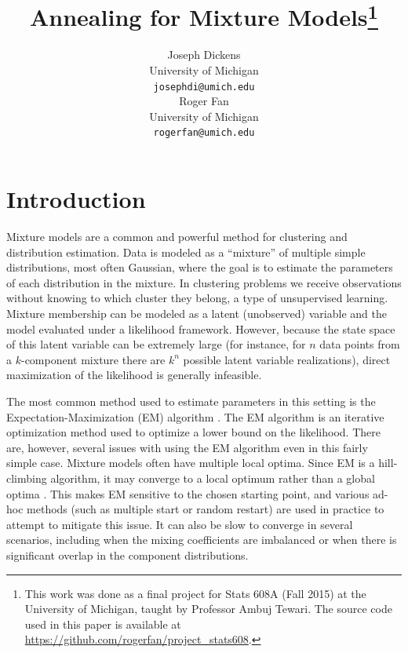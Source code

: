 \documentclass{article}
\theoremstyle{definition}
\theoremstyle{algodesc}
\begin{document}
\title{Annealing for Mixture Models\thanks{This work was done as a final project for Stats 608A (Fall 2015) at the University of Michigan, taught by Professor Ambuj Tewari. The source code used in this paper is available at \url{https://github.com/rogerfan/project_stats608}.}}
\author{
  Joseph Dickens \\
  University of Michigan \\
  \texttt{josephdi@umich.edu} \\
\And
  Roger Fan \\
  University of Michigan\\
  \texttt{rogerfan@umich.edu} \\
}

\maketitle


\section{Introduction} \label{sec:intro}

Mixture models are a common and powerful method for clustering and distribution estimation. Data is modeled as a ``mixture'' of multiple simple distributions, most often Gaussian, where the goal is to estimate the parameters of each distribution in the mixture. In clustering problems we receive observations without knowing to which cluster they belong, a type of unsupervised learning. Mixture membership can be modeled as a latent (unobserved) variable and the model evaluated under a likelihood framework. However, because the state space of this latent variable can be extremely large (for instance, for $n$ data points from a $k$-component mixture there are $k^n$ possible latent variable realizations), direct maximization of the likelihood is generally infeasible.

The most common method used to estimate parameters in this setting is the Expectation-Maximization (EM) algorithm \cite{dempsterlairdrubin77}. The EM algorithm is an iterative optimization method used to optimize a lower bound on the likelihood. There are, however, several issues with using the EM algorithm even in this fairly simple case. Mixture models often have multiple local optima. Since EM is a hill-climbing algorithm, it may converge to a local optimum rather than a global optima \cite{wu83}. This makes EM sensitive to the chosen starting point, and various ad-hoc methods (such as multiple start or random restart) are used in practice to attempt to mitigate this issue. It can also be slow to converge in several scenarios, including when the mixing coefficients are imbalanced or when there is significant overlap in the component distributions.
\end{document}
